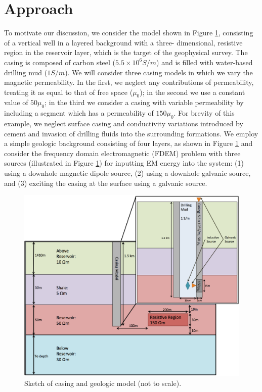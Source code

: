 \documentclass{segabs}
\begin{document}
\section{Approach}
\vspace{-8pt}
To motivate our discussion, we consider the model shown in Figure \ref{fig:CasingGeoModel}, consisting of a vertical well in a layered background with a three- dimensional, resistive region in the reservoir layer, which is the target of the geophysical survey. The casing is composed of carbon steel ($5.5 \times 10^6 S/m$) and is filled with water-based drilling mud ($1 S/m$). We will consider three casing models in which we vary the magnetic permeability. In the first, we neglect any contributions of permeability, treating it as equal to that of free space ($\mu_0$); in the second we use a constant value of $50\mu_0$; in the third we consider a casing with variable permeability by including a segment which has a permeability of $150\mu_0$. For brevity of this example, we neglect surface casing and conductivity variations introduced by cement and invasion of drilling fluids into the surrounding formations. We employ a simple geologic background consisting of four layers, as shown in Figure \ref{fig:CasingGeoModel} and consider the frequency domain electromagnetic (FDEM) problem with three sources (illustrated in Figure \ref{fig:CasingGeoModel}) for inputting EM energy into the system: (1) using a downhole magnetic dipole source, (2) using a downhole galvanic source, and (3) exciting the casing at the surface using a galvanic source.
\begin{figure}[h!]
	\centering
	\includegraphics[width=0.9\columnwidth]{./Figures/CasingGeoModel}
	\caption{Sketch of casing and geologic model (not to scale).}
	\label{fig:CasingGeoModel}
\end{figure}
\end{document}
